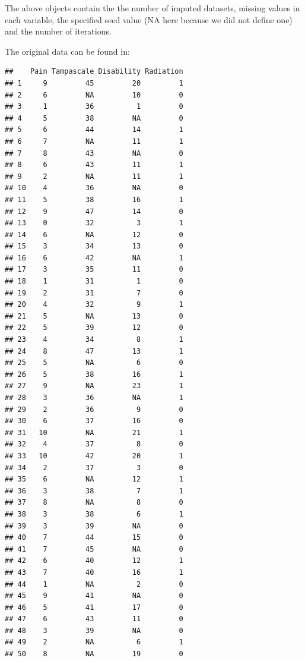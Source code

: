 \documentclass[]{book}
\newenvironment{Shaded}{\begin{snugshade}}{\end{snugshade}}
\newcommand{\OperatorTok}[1]{\textcolor[rgb]{0.81,0.36,0.00}{\textbf{#1}}}
\newcommand{\NormalTok}[1]{#1}
\begin{document}
The above objects contain the the number of imputed datasets, missing
values in each variable, the specified seed value (NA here because we
did not define one) and the number of iterations.

The original data can be found in:

\begin{Shaded}
\end{Shaded}

\begin{verbatim}
##    Pain Tampascale Disability Radiation
## 1     9         45         20         1
## 2     6         NA         10         0
## 3     1         36          1         0
## 4     5         38         NA         0
## 5     6         44         14         1
## 6     7         NA         11         1
## 7     8         43         NA         0
## 8     6         43         11         1
## 9     2         NA         11         1
## 10    4         36         NA         0
## 11    5         38         16         1
## 12    9         47         14         0
## 13    0         32          3         1
## 14    6         NA         12         0
## 15    3         34         13         0
## 16    6         42         NA         1
## 17    3         35         11         0
## 18    1         31          1         0
## 19    2         31          7         0
## 20    4         32          9         1
## 21    5         NA         13         0
## 22    5         39         12         0
## 23    4         34          8         1
## 24    8         47         13         1
## 25    5         NA          6         0
## 26    5         38         16         1
## 27    9         NA         23         1
## 28    3         36         NA         1
## 29    2         36          9         0
## 30    6         37         16         0
## 31   10         NA         21         1
## 32    4         37          8         0
## 33   10         42         20         1
## 34    2         37          3         0
## 35    6         NA         12         1
## 36    3         38          7         1
## 37    8         NA          8         0
## 38    3         38          6         1
## 39    3         39         NA         0
## 40    7         44         15         0
## 41    7         45         NA         0
## 42    6         40         12         1
## 43    7         40         16         1
## 44    1         NA          2         0
## 45    9         41         NA         0
## 46    5         41         17         0
## 47    6         43         11         0
## 48    3         39         NA         0
## 49    2         NA          6         1
## 50    8         NA         19         0
\end{verbatim}
\end{document}
